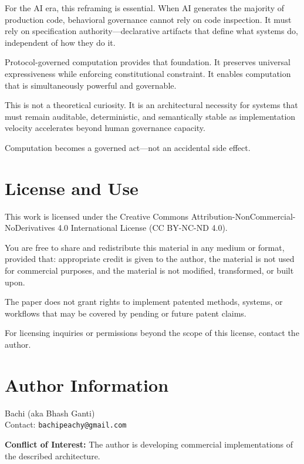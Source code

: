 \documentclass[11pt,a4paper]{article}
\begin{document}
For the AI era, this reframing is essential. When AI generates the majority of production code, behavioral governance cannot rely on code inspection. It must rely on specification authority---declarative artifacts that define what systems do, independent of how they do it.

Protocol-governed computation provides that foundation. It preserves universal expressiveness while enforcing constitutional constraint. It enables computation that is simultaneously powerful and governable.

This is not a theoretical curiosity. It is an architectural necessity for systems that must remain auditable, deterministic, and semantically stable as implementation velocity accelerates beyond human governance capacity.

Computation becomes a governed act---not an accidental side effect.



\section*{License and Use}

This work is licensed under the Creative Commons Attribution-NonCommercial-NoDerivatives 4.0 International License (CC BY-NC-ND 4.0).

You are free to share and redistribute this material in any medium or format, provided that: appropriate credit is given to the author, the material is not used for commercial purposes, and the material is not modified, transformed, or built upon.

The paper does not grant rights to implement patented methods, systems, or workflows that may be covered by pending or future patent claims.

For licensing inquiries or permissions beyond the scope of this license, contact the author.

\section*{Author Information}

\noindent Bachi (aka Bhash Ganti)\\
Contact: \texttt{bachipeachy@gmail.com}

\noindent\textbf{Conflict of Interest:} The author is developing commercial implementations of the described architecture.
\end{document}
